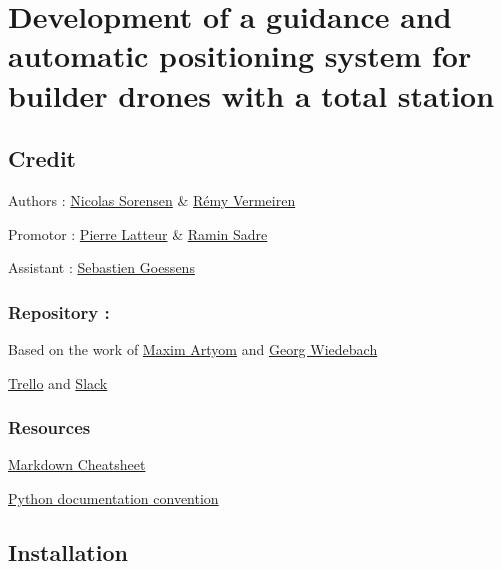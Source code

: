 \hypertarget{development-of-a-guidance-and-automatic-positioning-system-for-builder-drones-with-a-total-station}{%
\section{Development of a guidance and automatic positioning system for
builder drones with a total
station}\label{development-of-a-guidance-and-automatic-positioning-system-for-builder-drones-with-a-total-station}}

\hypertarget{credit}{%
\subsection{Credit}\label{credit}}

Authors : \href{https://github.com/nicolassorensen/}{Nicolas Sorensen}
\& \href{https://github.com/rvermeiren/}{Rémy Vermeiren}

Promotor :
\href{https://uclouvain.be/fr/repertoires/pierre.latteur}{Pierre
Latteur} \& \href{https://uclouvain.be/fr/repertoires/ramin.sadre}{Ramin
Sadre}

Assistant :
\href{https://uclouvain.be/fr/repertoires/sebastien.goessens}{Sebastien
Goessens}

\hypertarget{repository}{%
\subsubsection{Repository :}\label{repository}}

Based on the work of
\href{https://github.com/art-mx/leica_ros_sph}{Maxim Artyom} and
\href{https://github.com/georgwi/leica_ros_sph}{Georg Wiedebach}

\href{https://trello.com/b/cHMLdS54/m\%C3\%A9moire}{Trello} and
\href{https://tfebuildingwithdrones.slack.com/}{Slack}

\hypertarget{resources}{%
\subsubsection{Resources}\label{resources}}

\href{https://github.com/adam-p/markdown-here/wiki/Markdown-Cheatsheet}{Markdown
Cheatsheet}

\href{https://www.python.org/dev/peps/pep-0258/}{Python documentation
convention}

\hypertarget{installation}{%
\subsection{Installation}\label{installation}}

